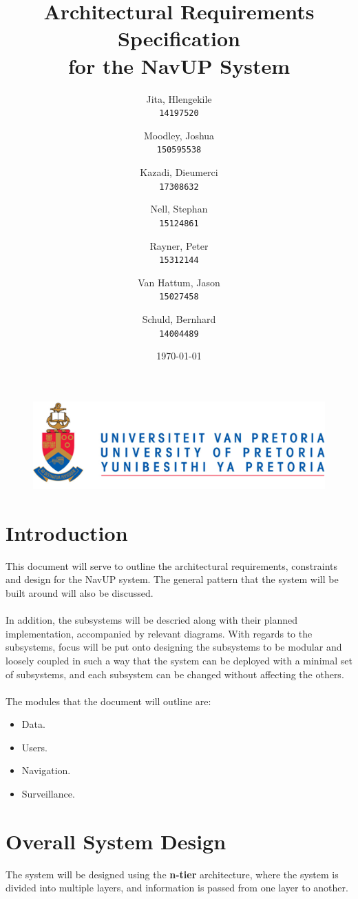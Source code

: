 \documentclass[english]{article}
\author{
	Jita, Hlengekile\\
	\texttt{14197520}
	\and
	Moodley, Joshua\\
	\texttt{150595538}
	\and
	Kazadi, Dieumerci\\
	\texttt{17308632}
	\and
	Nell, Stephan\\
	\texttt{15124861}
	\and
	Rayner, Peter\\
	\texttt{15312144}
	\and
	Van Hattum, Jason\\
	\texttt{15027458}
	\and
	Schuld, Bernhard\\
	\texttt{14004489}
}
\title{Architectural Requirements Specification\\
	for the NavUP System\\
	}
\date{\today}
\begin{document}
    \fboxsep=2mm

	\maketitle
	\begin{figure}[!t]
		\includegraphics{up_logo.png}
	\end{figure}
	\newpage

	\tableofcontents
	\newpage

	

	\section{Introduction}

		This document will serve to outline the architectural requirements, constraints and design for the NavUP system. The general pattern that the system will be built around will also be discussed.\\
        \\
		In addition, the subsystems will be descried along with their planned implementation, accompanied by relevant diagrams. With regards to the subsystems, focus will be put onto designing the subsystems to be modular and loosely coupled in such a way that the system can be deployed with a minimal set of subsystems, and each subsystem can be changed without affecting the others.\\
		\\		
		The modules that the document will outline are:
		\begin{itemize}
		    \item Data.
		    \item Users.
		    \item Navigation.
		    \item Surveillance.
		\end{itemize}
		
	\section{Overall System Design}
	    The system will be designed using the \textbf{n-tier} architecture, where the system is divided into multiple layers, and information is passed from one layer to another.
	        
\end{document}
